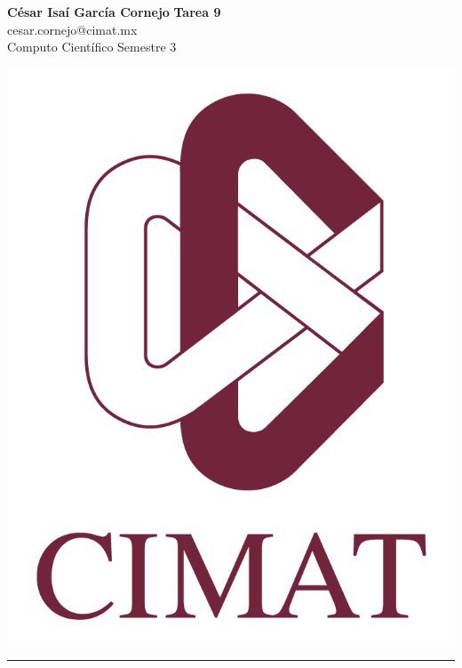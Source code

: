 \documentclass[a4paper, 11pt]{article}
\begin{document}
	\noindent
	
	\begin{minipage}[b][1.2cm][t]{0.8\textwidth}
		\large\textbf{César Isaí García Cornejo} \hfill \textbf{Tarea 9}  \\
		cesar.cornejo@cimat.mx \hfill \\
		\normalsize Computo Científico \hfill Semestre 3\\
	\end{minipage}
	
	\hspace{14.4cm}
	\begin{minipage}[b][0.03cm][t]{0.12\linewidth}
		
		\vspace{-2.2cm}
		\includegraphics[scale=0.3]{Figures/EscudoCimat.png}
	\end{minipage}
	
	\noindent\rule{7in}{2.8pt}
	
\end{document}
